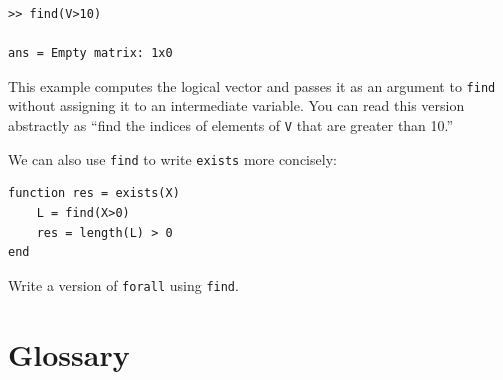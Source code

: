 \documentclass[
]{book}
\begin{document}
\begin{verbatim}
>> find(V>10)

ans = Empty matrix: 1x0
\end{verbatim}

This example computes the logical vector and passes it as an
argument to {\tt find} without assigning it to an intermediate
variable.  You can read this version abstractly as ``find
the indices of elements of {\tt V} that are greater than 10.''

We can also use {\tt find} to write {\tt exists} more concisely:

\begin{verbatim}
function res = exists(X)
    L = find(X>0)
    res = length(L) > 0
end
\end{verbatim}

\begin{ex}
Write a version of {\tt forall} using {\tt find}.
\end{ex}



\section{Glossary}
\end{document}
